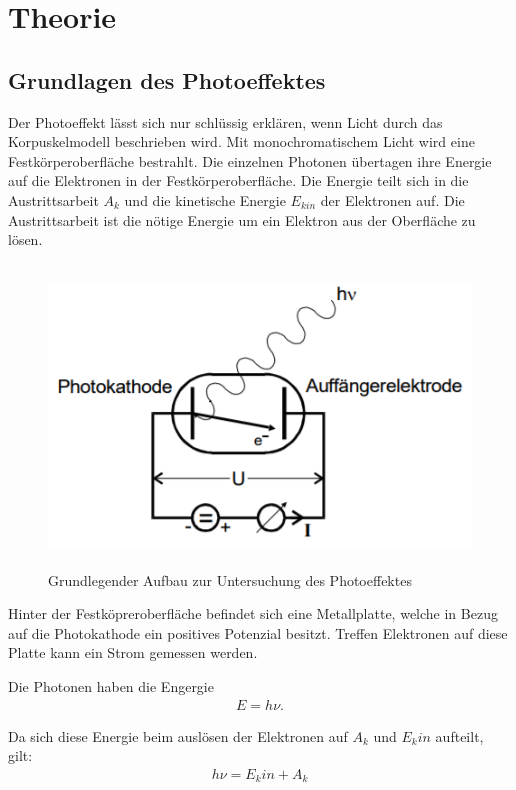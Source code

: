 \section{Theorie}
\label{sec:Theorie}

\cite{sample}

\subsection{Grundlagen des Photoeffektes}
Der Photoeffekt lässt sich nur schlüssig erklären, wenn Licht durch das Korpuskelmodell beschrieben wird.
Mit monochromatischem Licht wird eine Festkörperoberfläche bestrahlt. Die einzelnen Photonen
übertagen ihre Energie auf die Elektronen in der Festkörperoberfläche. Die Energie
teilt sich in die Austrittsarbeit $A_k$ und die kinetische Energie $E_{kin}$ der Elektronen auf.
Die Austrittsarbeit ist die nötige Energie um ein Elektron aus der Oberfläche zu lösen.

\begin{figure}[H]
  \centering
  \includegraphics[height=8cm]{anordnung.PNG}
  \caption{Grundlegender Aufbau zur Untersuchung des Photoeffektes}
  \label{fig:kathode}
\end{figure}

Hinter der Festköpreroberfläche befindet sich eine Metallplatte, welche in Bezug auf
die Photokathode ein positives Potenzial besitzt. Treffen Elektronen auf diese Platte
kann ein Strom gemessen werden.

Die Photonen haben die Engergie
\begin{align}
  E = h \nu.
\end{align}

Da sich diese Energie beim auslösen der Elektronen auf $A_k$ und $E_kin$ aufteilt, gilt:
\begin{align}
  h \nu = E_kin + A_k
\end{align}

